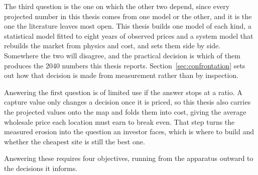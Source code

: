 The third question is the one on which the other two depend, since every
projected number in this thesis comes from one model or the other, and it is the
one the literature leaves most open. This thesis builds one model of
each kind, a statistical model fitted to eight years of observed prices and a
system model that rebuilds the market from physics and cost, and sets them side
by side. Somewhere the two will disagree, and the practical decision is which of
them produces the 2040 numbers this thesis reports. Section~\ref{sec:confrontation}
sets out how that decision is made from measurement rather than by inspection.

Answering the first question is of limited use if the answer stops at a ratio.
A capture value only changes a decision once it is priced, so this thesis also
carries the projected values onto the map and folds them into cost, giving the
average wholesale price each location must earn to break even. That step turns
the measured erosion into the question an investor faces, which is
where to build and whether the cheapest site is still the best one.

Answering these requires four objectives, running from the apparatus outward to
the decisions it informs.

